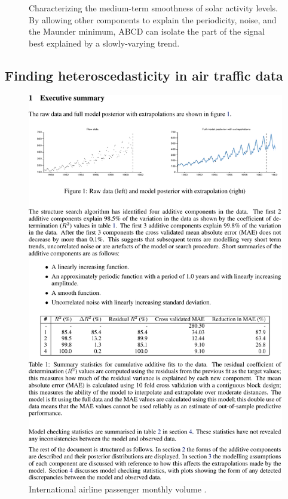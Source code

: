 \documentclass[letterpaper]{article}
\newcommand{\procedurename}{ABCD}
\begin{document}
\begin{figure}[h!]
\centering
{}
\caption{Characterizing the medium-term smoothness of solar activity levels.  By allowing other components to explain the periodicity, noise, and the Maunder minimum, \procedurename{} can isolate the part of the signal best explained by a slowly-varying trend.}
\label{fig:smooth}
\end{figure}

\subsection{Finding heteroscedasticity in air traffic data}
\label{sec:airline}

\begin{figure}[h]
\centering
\includegraphics[trim=0.4cm 16.8cm 8cm 2cm, clip, width=0.98\columnwidth, height=0.45\columnwidth]{airlinepages/pg_0002-crop}
\caption{
International airline passenger monthly volume \citep[e.g.][]{box2013time}.}
\label{fig:airline}
\end{figure}
\end{document}

